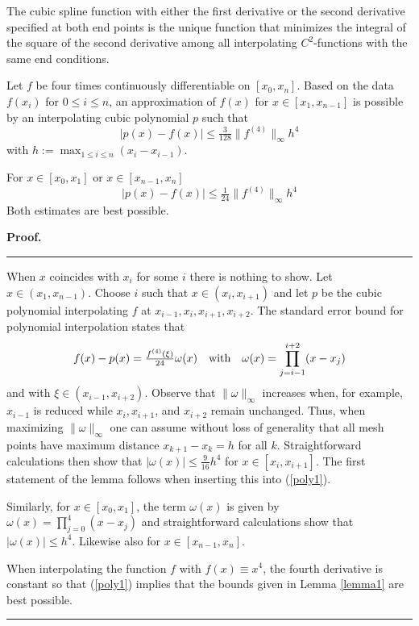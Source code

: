 \documentclass[10pt,a4paper]{amsart}
\def\bee{\begin{equation}}
\def\ene{\end{equation}}
\def\mr#1{(\ref{#1})}
\newenvironment{proof}{\begin{list}{$\!\!${\bf Proof.}%
  \rule{1pt}{0pt}}{\setlength{\leftmargin}{0pt}%
  \setlength{\itemindent}{30pt}%
  \setlength{\listparindent}{15pt}}\item}{\rule{0.3em}{0mm}%
  \hfill\framebox[1.2ex]{\rule{0.3em}{0mm}}\end{list}}
\begin{document}
\begin{lemma}\label{lemma1}
  The cubic spline function with either the first derivative
  or the second derivative specified at both end points 
  is the unique function that
  minimizes the integral of the square
  of the second derivative among all interpolating $C^2$-functions
  with the same end conditions.
\end{lemma}

\begin{lemma}\label{3128}
  Let $f$ be four times continuously differentiable on $[x_0,x_n]$.
  Based on the data $f(x_i)$ for $0\le i\le n$,
  an approximation of $f(x)$ for $x\in[x_1,x_{n-1}]$ is possible
  by an interpolating cubic polynomial $p$ such that 
  $$
  |p(x)-f(x)|\le \tfrac{3}{128}\|f^{(4)}\|_\infty h^4
  $$
  with $h:=\max_{1\le i\le n}(x_i-x_{i-1})$.
  
  For $x\in[x_0,x_1]$ or $x\in[x_{n-1},x_n]$ 
  $$
  |p(x)-f(x)|\le \tfrac{1}{24}\|f^{(4)}\|_\infty h^4
  $$
  Both estimates are  best possible.
\end{lemma}

\begin{proof}
  When $x$ coincides with $x_i$ for some $i$ there is nothing to show.
  Let $x\in(x_1,x_{n-1})$. Choose $i$ such that $x\in(x_i,x_{i+1})$ and
  let $p$ be the cubic polynomial interpolating $f$ at
  $x_{i-1},x_i,x_{i+1},x_{i+2}$.
  The standard error bound
  for polynomial interpolation states that
  \bee\label{poly1}
  f(x)-p(x)=\tfrac{f^{(4)}(\xi)}{24} \omega(x) \quad\hbox{with}
  \quad \omega(x) = \prod_{j=i-1}^{i+2}(x-x_j)
  \ene
  and with $\xi\in (x_{i-1},x_{i+2})$.
  Observe that $\|\omega\|_\infty$ increases when, for example,
  $x_{i-1}$ is reduced while $x_i, x_{i+1}$, and $x_{i+2}$ remain
  unchanged. Thus, when maximizing $\|\omega\|_\infty$ one can
  assume without loss of generality that all mesh points have
  maximum distance $x_{k+1}-x_k = h$ for all $k$.
  Straightforward calculations then show that
  $|\omega(x)|\le \tfrac 9{16}h^4$
  for $x\in [x_i,x_{i+1}]$.
  The first statement of the 
  lemma follows when inserting this into \mr{poly1}.

  Similarly, for $x\in [x_0,x_{1}]$, the term $\omega(x)$ is given by
  $\omega(x)= \prod_{j=0}^{4}(x-x_j)$ and straightforward calculations show that
  $|\omega(x)|\le h^4$.
  Likewise also for $x\in[x_{n-1},x_n]$.

  When interpolating the function $f$ with $f(x)\equiv x^4$, the fourth derivative is constant
  so that \mr{poly1} implies that the bounds given in Lemma \ref{lemma1} are best possible.
\end{proof}
\end{document}
